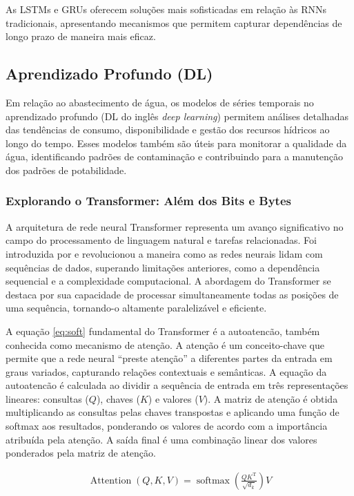 As LSTMs e GRUs oferecem soluções mais sofisticadas em relação às RNNs tradicionais, apresentando mecanismos que permitem capturar dependências de longo prazo de maneira mais eficaz.

\subsection{Aprendizado Profundo (DL)}

Em relação ao abastecimento de água, os modelos de séries temporais no aprendizado profundo (DL do inglês \textit{deep learning}) permitem análises detalhadas das tendências de consumo, disponibilidade e gestão dos recursos hídricos ao longo do tempo. Esses modelos também são úteis para monitorar a qualidade da água, identificando padrões de contaminação e contribuindo para a manutenção dos padrões de potabilidade. 

\subsubsection{Explorando o Transformer: Al\'em dos Bits e Bytes}

A arquitetura de rede neural Transformer representa um avanço significativo no campo do processamento de linguagem natural e tarefas relacionadas. Foi introduzida por \cite{vaswani2017attention} e revolucionou a maneira como as redes neurais lidam com sequências de dados, superando limitações anteriores, como a dependência sequencial e a complexidade computacional. A abordagem do Transformer se destaca por sua capacidade de processar simultaneamente todas as posições de uma sequência, tornando-o altamente paralelizável e eficiente.

A equação \eqref{eq:soft} fundamental do Transformer é a autoatencão, também conhecida como mecanismo de atenção. A atenção é um conceito-chave que permite que a rede neural ``preste atenção'' a diferentes partes da entrada em graus variados, capturando relações contextuais e semânticas. A equação da autoatencão é calculada ao dividir a sequência de entrada em três representações lineares: consultas ($Q$), chaves ($K$) e valores ($V$). A matriz de atenção é obtida multiplicando as consultas pelas chaves transpostas e aplicando uma função de softmax aos resultados, ponderando os valores de acordo com a importância atribuída pela atenção. A saída final é uma combinação linear dos valores ponderados pela matriz de atenção.

\begin{eqnarray}
	\operatorname{Attention}(Q, K, V)=\operatorname{softmax}\left(\frac{Q K^{\mathrm{T}}}{\sqrt{d_k}}\right) V \label{eq:soft}
\end{eqnarray}

